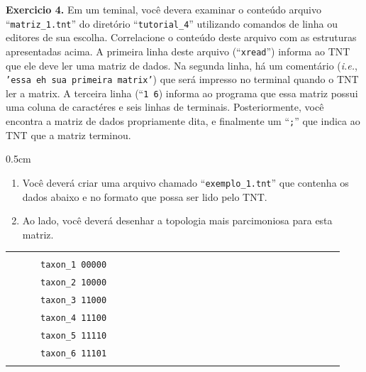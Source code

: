 \begin{refsection}
\begin{blackBlock}{\textbf{Exercicio 4.}}\label{tut4:ex:4.1}
	Em um teminal, você devera examinar o conteúdo arquivo ``\texttt{matriz\_1.tnt}'' do diretório  ``\texttt{tutorial\_4}'' utilizando comandos de linha ou editores de sua escolha. Correlacione o conteúdo deste arquivo com as estruturas apresentadas acima. A primeira linha deste arquivo (``\texttt{xread}'') informa ao TNT que ele deve ler uma matriz de dados. Na segunda linha, há um comentário (\textit{i.e.}, \texttt{'essa eh sua primeira matrix'}) que será impresso no terminal quando o TNT ler a matrix. A terceira linha (``\texttt{1 6}) informa ao programa que essa matriz possui uma coluna de caractéres e seis linhas de terminais. Posteriormente, você encontra a matriz de dados propriamente dita, e finalmente um ``\texttt{;}'' que indica ao TNT que a matriz terminou.

\begin {myindentpar}{0.5cm}
\begin{enumerate}[\itshape i.]
	\item{Você deverá criar uma arquivo chamado ``\texttt{exemplo\_1.tnt}'' que contenha os dados abaixo e no formato que possa ser lido pelo TNT.}\label{tut4:input:ex1:matriz}

	\item{Ao lado, você deverá desenhar a topologia mais parcimoniosa para esta matriz.}\label{tut4:input:ex1:tree_manual}\\

\end{enumerate}
\end{myindentpar}
\end{blackBlock}

\begin{table}[H]
\begin{tabular}{|l|l|}
\hline
 & \\
~~~~~~\texttt{taxon\_1 00000}~~~~~~ & ~~~~~~~~~~~~~~~~~~~~~~~~~~~~~~~~~~~~~~ \\
~~~~~~\texttt{taxon\_2 10000}~~~~~~ & ~~~~~~~~~~~~~~~~~~~~~~~~~~~~~~~~~~~~~~ \\
~~~~~~\texttt{taxon\_3 11000}~~~~~~ & ~~~~~~~~~~~~~~~~~~~~~~~~~~~~~~~~~~~~~~ \\
~~~~~~\texttt{taxon\_4 11100}~~~~~~ & ~~~~~~~~~~~~~~~~~~~~~~~~~~~~~~~~~~~~~~ \\
~~~~~~\texttt{taxon\_5 11110}~~~~~~ & ~~~~~~~~~~~~~~~~~~~~~~~~~~~~~~~~~~~~~~ \\
~~~~~~\texttt{taxon\_6 11101}~~~~~~ & ~~~~~~~~~~~~~~~~~~~~~~~~~~~~~~~~~~~~~~ \\
 & \\\hline
\end{tabular}
\end{table}





\end{refsection}
